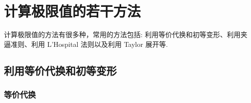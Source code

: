 \section{计算极限值的若干方法}

计算极限值的方法有很多种，常用的方法包括: 利用等价代换和初等变形、利用夹逼准则、利用 L'Hospital 法则以及利用 Taylor 展开等.

\subsection{利用等价代换和初等变形}

\subsubsection{等价代换}


